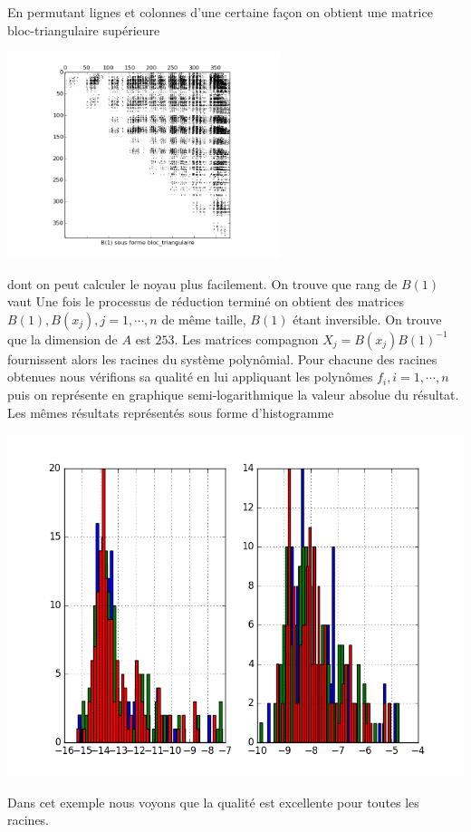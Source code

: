 \documentclass{standalone}
\begin{document}
  En permutant lignes et colonnes d'une certaine façon on obtient une matrice bloc-triangulaire supérieure
   \begin{center}
  \includegraphics[width=8cm]{../png/beztri.png}
  \end{center}
  dont on peut calculer le noyau plus facilement. On trouve que rang de $B(1)$ vaut 
  Une fois le processus de réduction terminé on obtient des matrices $B(1), B(x_j), j=1,\cdots,n$ de même taille, $B(1)$ étant inversible. On trouve que la dimension de $A$ est $253$. Les matrices compagnon $X_j = B(x_j)B(1)^{-1}$ fournissent alors les racines du système polynômial. Pour chacune des racines obtenues nous vérifions sa qualité en lui appliquant les polynômes $f_i, i=1,\cdots,n$ puis on représente en graphique semi-logarithmique la  valeur absolue du résultat. Les mêmes résultats représentés sous forme d'histogramme
   \begin{center}
  \includegraphics[height=10cm, width=18cm]{../png/ref.png}
  \end{center}

  Dans cet exemple nous voyons que la qualité est excellente pour toutes les racines.
\end{document}
